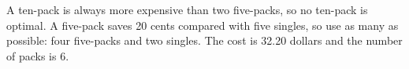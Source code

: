 A ten-pack is always more expensive than two five-packs, so no ten-pack is optimal. A five-pack saves 20 cents compared with five singles, so use as many as possible: four five-packs and two singles. The cost is 32.20 dollars and the number of packs is $\boxed6$.
